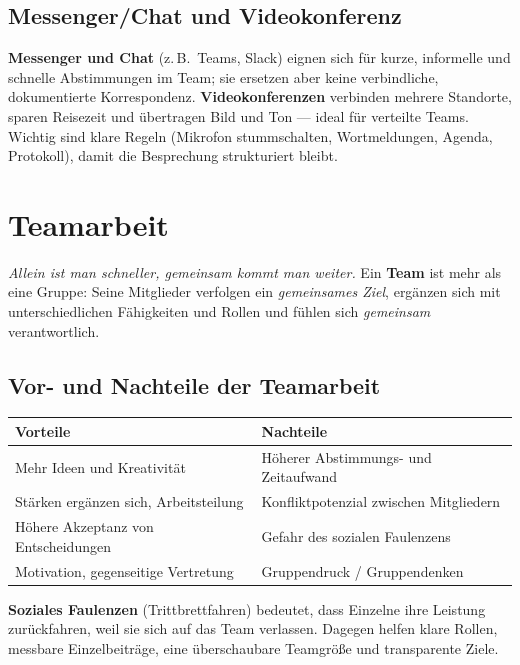 \documentclass[11pt, a4paper]{article}
\begin{document}
\subsection{Messenger/Chat und Videokonferenz}

\textbf{Messenger und Chat} (z.\,B.\ Teams, Slack) eignen sich für kurze, informelle und
schnelle Abstimmungen im Team; sie ersetzen aber keine verbindliche, dokumentierte
Korrespondenz. \textbf{Videokonferenzen} verbinden mehrere Standorte, sparen Reisezeit
und übertragen Bild und Ton --- ideal für verteilte Teams. Wichtig sind klare Regeln
(Mikrofon stummschalten, Wortmeldungen, Agenda, Protokoll), damit die Besprechung
strukturiert bleibt.

\section{Teamarbeit}

\emph{Allein ist man schneller, gemeinsam kommt man weiter.} Ein \textbf{Team} ist mehr
als eine Gruppe: Seine Mitglieder verfolgen ein \emph{gemeinsames Ziel}, ergänzen sich
mit unterschiedlichen Fähigkeiten und Rollen und fühlen sich \emph{gemeinsam}
verantwortlich.

\subsection{Vor- und Nachteile der Teamarbeit}

\begin{center}
\begin{tabular}{p{6.2cm} p{6.2cm}}
\toprule
\textbf{Vorteile} & \textbf{Nachteile}\\
\midrule
Mehr Ideen und Kreativität & Höherer Abstimmungs- und Zeitaufwand\\
Stärken ergänzen sich, Arbeitsteilung & Konfliktpotenzial zwischen Mitgliedern\\
Höhere Akzeptanz von Entscheidungen & Gefahr des sozialen Faulenzens\\
Motivation, gegenseitige Vertretung & Gruppendruck / Gruppendenken\\
\bottomrule
\end{tabular}
\end{center}

\medskip
\textbf{Soziales Faulenzen} (Trittbrettfahren) bedeutet, dass Einzelne ihre Leistung
zurückfahren, weil sie sich auf das Team verlassen. Dagegen helfen klare Rollen,
messbare Einzelbeiträge, eine überschaubare Teamgröße und transparente Ziele.
\end{document}
